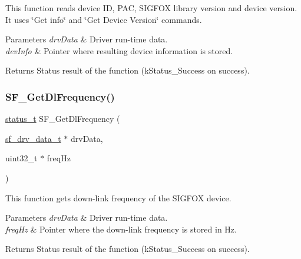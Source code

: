 This function reads device ID, P\+AC, S\+I\+G\+F\+OX library version and device version. It uses \char`\"{}\+Get info\char`\"{} and \char`\"{}\+Get Device Version\char`\"{} commands. 


\begin{DoxyParams}{Parameters}
{\em drv\+Data} & Driver run-\/time data. \\
\hline
{\em dev\+Info} & Pointer where resulting device information is stored.\\
\hline
\end{DoxyParams}
\begin{DoxyReturn}{Returns}
Status result of the function (k\+Status\+\_\+\+Success on success). 
\end{DoxyReturn}
\mbox{\label{group__sf__functions__group_ga63bcdd51a7da55f9e2f204d9d3a56d6b}} 
\subsubsection{\texorpdfstring{SF\_GetDlFrequency()}{SF\_GetDlFrequency()}}
{\footnotesize\ttfamily \mbox{\hyperlink{group__ksdk__common_gaaabdaf7ee58ca7269bd4bf24efcde092}{status\+\_\+t}} S\+F\+\_\+\+Get\+Dl\+Frequency (\begin{DoxyParamCaption}\item[{\mbox{\hyperlink{structsf__drv__data__t}{sf\+\_\+drv\+\_\+data\+\_\+t}} $\ast$}]{drv\+Data,  }\item[{uint32\+\_\+t $\ast$}]{freq\+Hz }\end{DoxyParamCaption})}



This function gets down-\/link frequency of the S\+I\+G\+F\+OX device. 


\begin{DoxyParams}{Parameters}
{\em drv\+Data} & Driver run-\/time data. \\
\hline
{\em freq\+Hz} & Pointer where the down-\/link frequency is stored in Hz.\\
\hline
\end{DoxyParams}
\begin{DoxyReturn}{Returns}
Status result of the function (k\+Status\+\_\+\+Success on success). 
\end{DoxyReturn}
\mbox{\label{group__sf__functions__group_ga83b0684858db1e51ddd77c542db9570a}} 
